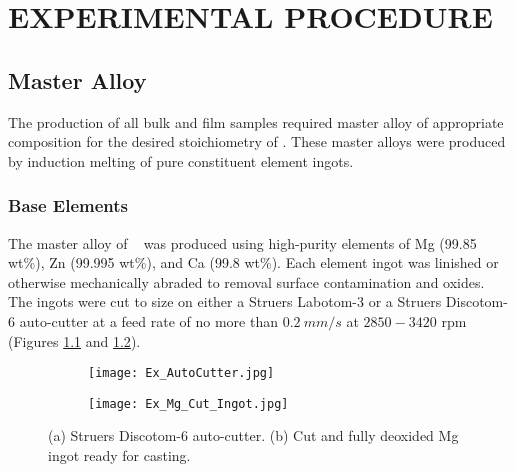 \documentclass[a4paper,12pt,oneside]{report}%
\begin{document}

\tableofcontents\newpage
{}
\let\cleardoublepage\clearpage


\chapter{EXPERIMENTAL PROCEDURE}

\section{Master Alloy}
The production of all bulk and film samples required master alloy of appropriate composition for the desired stoichiometry of \MgZnCa. These master alloys were produced by induction melting of pure constituent element ingots.

\subsection{Base Elements}
The master alloy of \MgZnCa~ was produced using high-purity elements of Mg (99.85 wt\%), Zn (99.995 wt\%), and Ca (99.8 wt\%). Each element ingot was linished or otherwise mechanically abraded to removal surface contamination and oxides. The ingots were cut to size on either a Struers Labotom-3 or a Struers Discotom-6 auto-cutter at a feed rate of no more than $0.2~ mm/s$ at $2850 - 3420$ \acrshort{rpm} (Figures \ref{fig:AutoCutter} and \ref{fig:MgIngot}).

\begin{figure}[htbp]
	\centering
	\begin{subfigure}[htbp]{0.49\textwidth}
		\texttt{[image: Ex\_AutoCutter.jpg]}
		\caption{}
		\label{fig:AutoCutter}
	\end{subfigure}
	\begin{subfigure}[htbp]{0.30\textwidth}
		\texttt{[image: Ex\_Mg\_Cut\_Ingot.jpg]}
		\caption{}
		\label{fig:MgIngot}
	\end{subfigure}
	\caption{(a) Struers Discotom-6 auto-cutter. (b) Cut and fully deoxided Mg ingot ready for casting.}%
	\label{fig:Cutter_MgIngot}
\end{figure}
\end{document}

